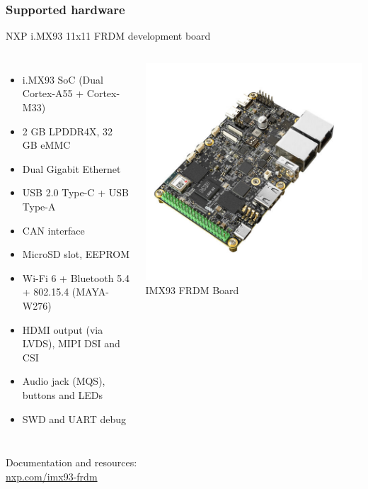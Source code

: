 \begin{frame}
\frametitle{Supported hardware}
  NXP i.MX93 11x11 FRDM development board
  \footnotesize
  \begin{columns}
    \begin{itemize}
    \item i.MX93 SoC (Dual Cortex-A55 + Cortex-M33)
    \item 2 GB LPDDR4X, 32 GB eMMC
    \item Dual Gigabit Ethernet
    \item USB 2.0 Type-C + USB Type-A
    \item CAN interface
    \item MicroSD slot, EEPROM
    \item Wi-Fi 6 + Bluetooth 5.4 + 802.15.4 (MAYA-W276)
    \item HDMI output (via LVDS), MIPI DSI and CSI
    \item Audio jack (MQS), buttons and LEDs
    \item SWD and UART debug
    \end{itemize}
    \begin{center}
    \includegraphics[width=\textwidth]{slides/discovery-board-imx93-frdm/imx93-frdm.png}\\
    IMX93 FRDM Board
    \end{center}
  \end{columns}
  \vspace{0.5em}
  Documentation and resources: \\
  \href{https://www.nxp.com/design/design-center/development-boards-and-designs/frdm-i-mx-93-development-board:FRDM-IMX93}{nxp.com/imx93-frdm}
\end{frame}
